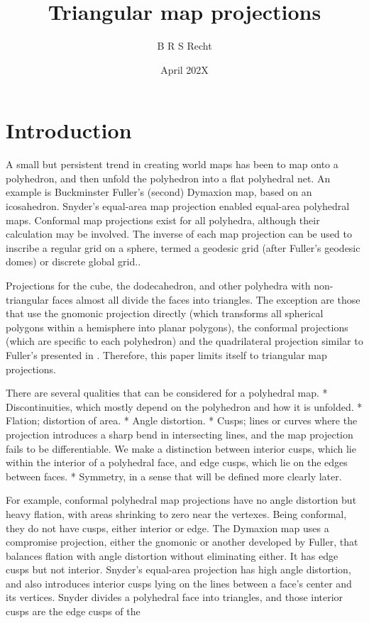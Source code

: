 \documentclass{amsart}[12pt]
\title{Triangular map projections}
\author{B R S Recht}
\date{April 202X}
\begin{document}
\maketitle
\tableofcontents

\section{Introduction}
A small but persistent trend in creating world maps has been to map onto a polyhedron, and then unfold the polyhedron into a flat polyhedral net. An example is Buckminster Fuller's (second) Dymaxion map, based on an icosahedron.\cite{gray94} Snyder's equal-area map projection enabled equal-area polyhedral maps.\cite{snyder92} Conformal map projections exist for all polyhedra, although their calculation may be involved.\cite{lee1976conformal} The inverse of each map projection can be used to inscribe a regular grid on a sphere, termed a geodesic grid (after Fuller's geodesic domes) or discrete global grid.\cite{williamson}\cite{sahr98}.

Projections for the cube, the dodecahedron, and other polyhedra with non-triangular faces almost all divide the faces into triangles. The exception are those that use the gnomonic projection directly (which transforms all spherical polygons within a hemisphere into planar polygons), the conformal projections (which are specific to each polyhedron) and the quadrilateral projection similar to Fuller's presented in \cite{crider09}. Therefore, this paper limits itself to triangular map projections. 

There are several qualities that can be considered for a polyhedral map.
* Discontinuities, which mostly depend on the polyhedron and how it is unfolded.
* Flation; distortion of area. 
* Angle distortion.
* Cusps; lines or curves where the projection introduces a sharp bend in intersecting lines, and the map projection fails to be differentiable. We make a distinction between interior cusps, which lie within the interior of a polyhedral face, and edge cusps, which lie on the edges between faces.
* Symmetry, in a sense that will be defined more clearly later.

For example, conformal polyhedral map projections have no angle distortion but heavy flation, with areas shrinking to zero near the vertexes. Being conformal, they do not have cusps, either interior or edge. The Dymaxion map uses a compromise projection, either the gnomonic or another developed by Fuller, that balances flation with angle distortion without eliminating either. It has edge cusps but not interior. Snyder's equal-area projection has high angle distortion, and also introduces interior cusps lying on the lines between a face's center and its vertices. Snyder divides a polyhedral face into triangles, and those interior cusps are the edge cusps of the 
\end{document}
